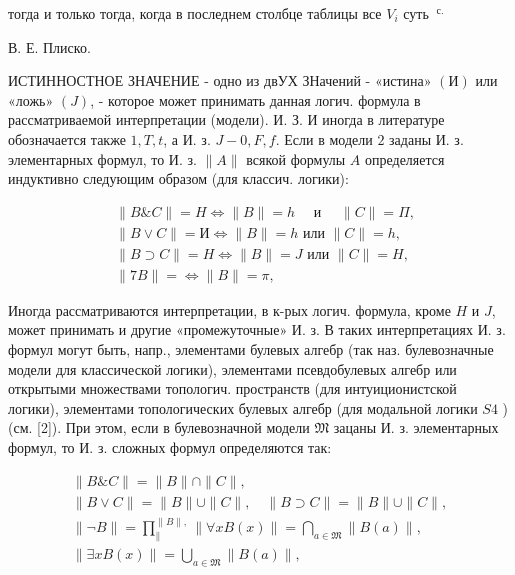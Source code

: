 \documentclass[10pt]{article}
\begin{document}
тогда и только тогда, когда в последнем столбце таблицы все $V_{i}$ суть $\boldsymbol{~}^{\text {с. }}$



В. Е. Плиско.



ИСТИННОСТНОЕ ЗНАЧЕНИЕ - одно из двУХ ЗНачений - «истина» $(И)$ или «ложь» $(J)$, - которое может принимать данная логич. формула в рассматриваемой интерпретации (модели). И. З. И иногда в литературе обозначается также $1, T, t$, а И. з. $J-0, F, f$. Если в модели $\mathfrak{2}$ заданы И. з. элементарных формул, то И. з. $\|A\|$ всякой формулы $A$ определяется индуктивно следующим образом (для классич. логики):



\[

\begin{aligned}

& \|B \& C\|=H \Leftrightarrow\|B\|=h \quad \text { и } \quad\|C\|=\Pi, \\

& \|B \vee C\|=И \Leftrightarrow\|B\|=h \text { или }\|C\|=h \text {, } \\

& \|B \supset C\|=H \Leftrightarrow\|B\|=J \text { или }\|C\|=H \text {, } \\

& \|7 B\|=\Leftrightarrow\|B\|=\pi \text {, }

\end{aligned}

\]



Иногда рассматриваются интерпретации, в к-рых логич. формула, кроме $H$ и $J$, может принимать и другие «промежуточные» И. з. В таких интерпретациях И. з. формул могут быть, напр., элементами булевых алгебр (так наз. булевозначные модели для классической логики), элементами псевдобулевых алгебр или открытыми множествами топологич. пространств (для интуиционистской логики), элементами топологических булевых алгебр (для модальной логики $S 4$ ) (см. [2]). При этом, если в булевозначной модели $\mathfrak{M}$ зацаны И. з. элементарных формул, то И. з. сложных формул определяются так:



\[

\begin{gathered}

\|B \& C\|=\|B\| \cap\|C\|, \\

\|B \vee C\|=\|B\| \cup\|C\|, \quad\|B \supset C\|=\|B\| \cup\|C\|, \\

\|\neg B\|=\prod_{\|}^{\|B\|,}\|\forall x B(x)\|=\bigcap_{a \in \mathfrak{M}}\|B(a)\|, \\

\|\exists x B(x)\|=\bigcup_{a \in \mathfrak{M}}\|B(a)\|,

\end{gathered}

\]
\end{document}
